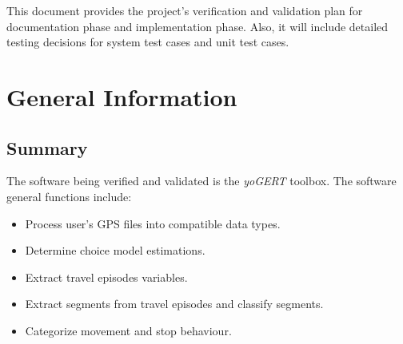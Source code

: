 \documentclass[12pt, titlepage]{article}
\begin{document}


\newpage


This document provides the project's verification and 
validation plan for documentation phase and implementation phase. Also, it will include detailed testing decisions for system test cases and unit test cases.  

\section{General Information}

\subsection{Summary}
The software being verified and validated is the \emph{yoGERT} toolbox. The software general functions include:
\begin{itemize}
    \item Process user's GPS files into compatible data types.
    \item Determine choice model estimations.
    \item Extract travel episodes variables.
    \item Extract segments from travel episodes and classify segments.
    \item Categorize movement and stop behaviour. 
\end{itemize}

\end{document}
